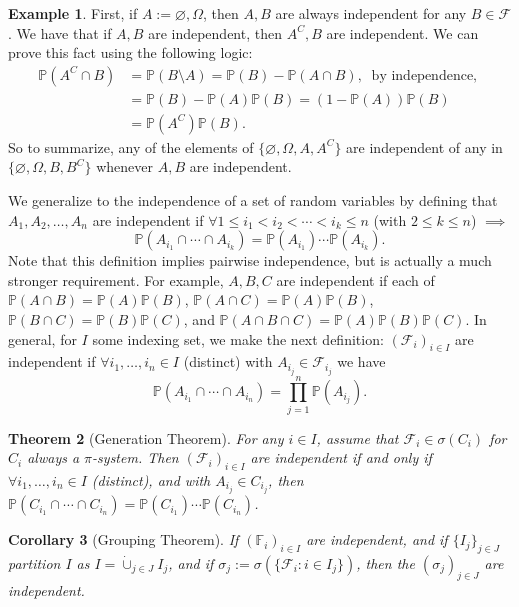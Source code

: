 \documentclass[12pt,reqno]{article}
\theoremstyle{plain}
\newtheorem{theorem}{Theorem}[section]
\newtheorem{cor}[theorem]{Corollary}
\theoremstyle{definition}
\newtheorem{example}[theorem]{Example}
\newcommand{\PP}[1]{\ensuremath{\mathbb{P}\left(#1\right)}}
\begin{document}
\begin{example} 
First, if $A := \varnothing,\Omega$, then $A,B$ are always independent for any $B \in \mathcal{F}$. 
We have that if $A,B$ are independent, then $A^C,B$ are independent. We can prove this fact using the 
following logic:
\begin{align*} 
\mathbb{P}(A^C \cap B) & = \mathbb{P}(B \setminus A) = \mathbb{P}(B) - \mathbb{P}(A \cap B),\ 
     \text{ by independence, } \\ 
     & = \mathbb{P}(B) - \mathbb{P}(A) \mathbb{P}(B) = (1-\mathbb{P}(A)) \mathbb{P}(B) \\ 
     & = \mathbb{P}(A^C) \mathbb{P}(B). 
\end{align*} 
So to summarize, any of the elements of $\{\varnothing,\Omega,A,A^C\}$ are independent of any in 
$\{\varnothing,\Omega,B,B^C\}$ whenever $A,B$ are independent. 
\end{example} 
We generalize to the independence of a set of random variables by defining that 
$A_1,A_2,\ldots,A_n$ are independent if $\forall 1 \leq i_1 < i_2 < \cdots < i_k \leq n$ (with 
$2 \leq k \leq n$) $\implies$ 
\[
\mathbb{P}(A_{i_1} \cap \cdots \cap A_{i_k}) = \mathbb{P}(A_{i_1}) \cdots \mathbb{P}(A_{i_k}). 
\]
Note that this definition implies pairwise independence, but is actually a much stronger 
requirement. For example, $A,B,C$ are independent if each of 
$\PP{A \cap B} = \PP{A} \PP{B}$, $\PP{A \cap C} = \PP{A} \PP{B}$, 
$\PP{B \cap C} = \PP{B} \PP{C}$, and $\PP{A \cap B \cap C} = \PP{A} \PP{B} \PP{C}$. 
In general, for $I$ some indexing set, we make the next definition: 
$(\mathcal{F}_i)_{i \in I}$ are independent if $\forall i_1,\ldots,i_n \in I$ (distinct) with 
$A_{i_j} \in \mathcal{F}_{i_j}$ we have 
\[
\PP{A_{i_1} \cap \cdots \cap A_{i_n}} = \prod_{j=1}^n \PP{A_{i_j}}. 
\]

\begin{theorem}[Generation Theorem] 
For any $i \in I$, assume that $\mathcal{F}_i \in \sigma(C_i)$ for $C_i$ always a $\pi$-system. 
Then $(\mathcal{F}_i)_{i \in I}$ are independent if and only if $\forall i_1,\ldots,i_n \in I$ 
(distinct), and with $A_{i_j} \in C_{i_j}$, then 
$\PP{C_{i_1} \cap \cdots \cap C_{i_n}} = \PP{C_{i_1}} \cdots \PP{C_{i_n}}$. 
\end{theorem} 

\begin{cor}[Grouping Theorem] 
If $(\mathbb{F}_i)_{i \in I}$ are independent, and if $\{I_j\}_{j \in J}$ partition $I$ as 
$I = \dot{\cup}_{j \in J} I_j$, and if $\sigma_j := \sigma(\{\mathcal{F}_i: i \in I_j\})$, 
then the $(\sigma_j)_{j \in J}$ are independent. 
\end{cor} 
\end{document}
